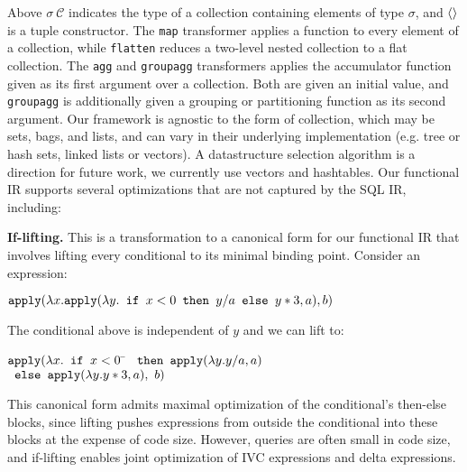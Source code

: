 \vspace{1mm}
\noindent Above $\sigma \ \mathcal{C}$ indicates the type of a collection
containing elements of type $\sigma$, and ${\langle\rangle}$ is a tuple constructor. The
\texttt{map} transformer applies a function to every element of a collection,
while \texttt{flatten} reduces a two-level nested collection to a flat
collection. The \texttt{agg} and \texttt{groupagg} transformers applies the
accumulator function given as its first argument over a collection. Both are
given an initial value, and \texttt{groupagg} is additionally given a grouping
or partitioning function as its second argument. Our framework is agnostic to
the form of collection, which may be sets, bags, and lists, and
can vary in their underlying implementation (e.g. tree or hash sets, linked lists or
vectors). A datastructure selection algorithm is a direction for future work, we
currently use vectors and hashtables. Our functional IR supports several
optimizations that are not captured by the SQL IR, including:

\vspace{1mm}
\noindent\textbf{If-lifting.} This is a transformation to a canonical form
for our functional IR that involves lifting every conditional to its minimal
binding point. Consider an expression:

$\mbox{\texttt{apply}}(\lambda x. \mbox{\texttt{apply}}(\lambda y.
  \mbox{\texttt{ if }} x < 0 \mbox{\texttt{ then }} y/a
                             \mbox{\texttt{ else }} y*3, a), b)$

\vspace{1mm}
\noindent The conditional above is independent of $y$ and we can lift to:

\vspace{-2mm}
\begin{tabbing}
$\mbox{\texttt{apply}}(\lambda x.
  \mbox{\texttt{ if }} x < 0$ \= $\mbox{\texttt{ then }}
    \mbox{\texttt{apply}}(\lambda y. y/a, a)$\\
\> $\mbox{\texttt{ else }} \mbox{\texttt{apply}}(\lambda y. y*3, a),\ b)$
\end{tabbing}


\vspace{-2mm}  
\noindent This canonical form admits maximal optimization of the conditional's
then-else blocks, since lifting pushes expressions from outside the conditional
into these blocks at the expense of code size. However, queries are often small
in code size, and if-lifting enables joint optimization of IVC expressions and
delta expressions.


